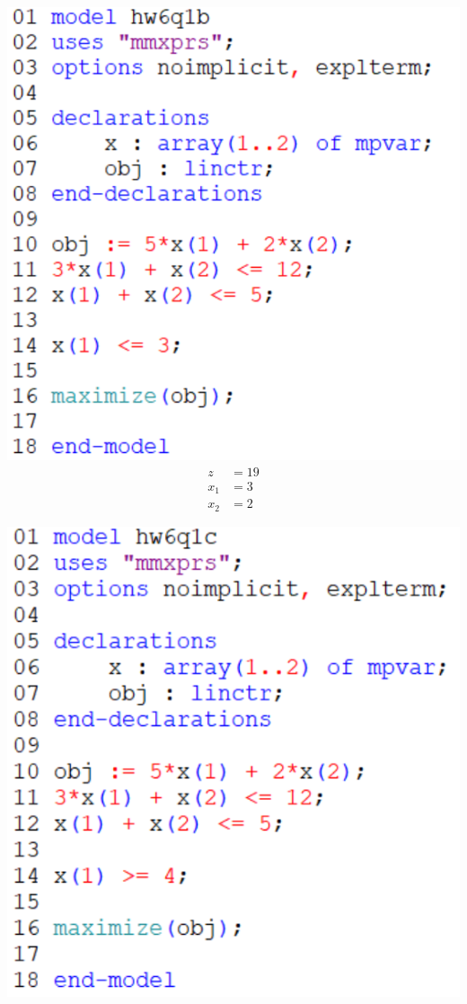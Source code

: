 \documentclass[12pt]{article}
\theoremstyle{definition}
\begin{document}
\begin{center}
    \begin{minipage}{0.4\textwidth}
        \includegraphics[width=\textwidth]{code1b.png}
        \begin{align*}
            z &= 19 \\
            x_1 &= 3 \\
            x_2 &= 2
        \end{align*}
    \end{minipage}
    \begin{minipage}{0.4\textwidth}
        \includegraphics[width=\textwidth]{code1c.png}

\end{minipage}
\end{center}
\end{document}
